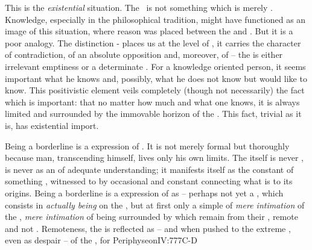This is the {\em existential} situation.  The \HH\ is not something which is
merely .  Knowledge, especially in the philosophical tradition,
might have functioned as an image of this situation, where reason was placed
between the  and .  But it is a poor analogy.
The distinction - places us at the level of
, it carries the character of contradiction, of an absolute
opposition and, moreover, of  -- the  is
either irrelevant emptiness or a determinate . 
%
For a knowledge oriented person, it seems important what he knows and, possibly,
what he does not know but would like to know. This positivistic element veils
completely (though not necessarily) the fact which is important: that no matter
how much and what one knows, it is always limited and surrounded by the immovable
horizon of the . This fact, trivial as it is, has existential import.

Being a borderline is a  expression of . It is not merely formal but thoroughly  because
  man, transcending himself, lives only his own limits. 
The  itself is never , is never  as an  of adequate
understanding; it manifests itself as the constant  of something
, witnessed to by occasional  and constant 
connecting what is  to its  origins. Being a
borderline is a  expression of  as 
-- perhaps not yet a , which consists in {\em
  actually being} on the , but at first only a simple
 of {\em mere intimation} of the , {\em mere
  intimation} of being surrounded by  which remain
 from their , remote and not .
%
Remoteness, the  is reflected as  -- and when pushed to
the extreme 
, even as despair -- of the , for \citet{the desire for the
  bliss, which she had lost, remained with her even after the
  Fall.}{Periphyseon}{IV:777C-D} 
%

